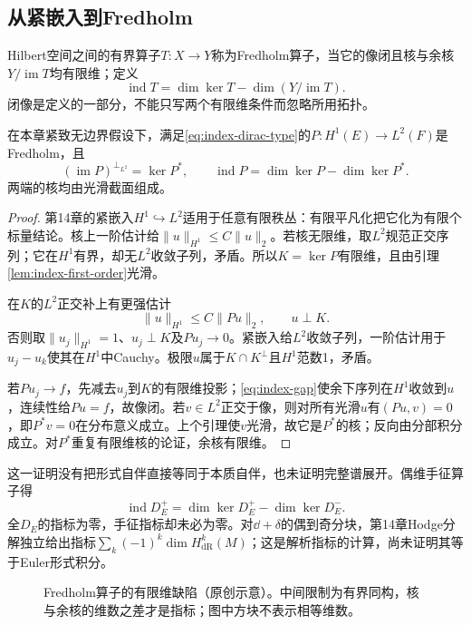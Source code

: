 \subsection{从紧嵌入到Fredholm}
Hilbert空间之间的有界算子$T:X\to Y$称为Fredholm算子，当它的像闭且核与余核$Y/\operatorname{im}T$均有限维；定义
\[
 \operatorname{ind}T=\dim\ker T-\dim(Y/\operatorname{im}T).
\]
闭像是定义的一部分，不能只写两个有限维条件而忽略所用拓扑。

\begin{theorem}\label{thm:index-fredholm}
在本章紧致无边界假设下，满足\eqref{eq:index-dirac-type}的$P:H^1(E)\to L^2(F)$是Fredholm，且
\[
 (\operatorname{im}P)^{\perp_{L^2}}=\ker P^*,\qquad
 \operatorname{ind}P=\dim\ker P-\dim\ker P^*.
\]
两端的核均由光滑截面组成。
\end{theorem}
\begin{proof}
第14章的紧嵌入$H^1\hookrightarrow L^2$适用于任意有限秩丛：有限平凡化把它化为有限个标量结论。核上一阶估计给$\|u\|_{H^1}\leq C\|u\|_2$。若核无限维，取$L^2$规范正交序列；它在$H^1$有界，却无$L^2$收敛子列，矛盾。所以$K=\ker P$有限维，且由引理\ref{lem:index-first-order}光滑。

在$K$的$L^2$正交补上有更强估计
\begin{equation}\label{eq:index-gap}
 \|u\|_{H^1}\leq C\|Pu\|_2,\qquad u\perp K.
\end{equation}
否则取$\|u_j\|_{H^1}=1$、$u_j\perp K$及$Pu_j\to0$。紧嵌入给$L^2$收敛子列，一阶估计用于$u_j-u_k$使其在$H^1$中Cauchy。极限$u$属于$K\cap K^\perp$且$H^1$范数1，矛盾。

若$Pu_j\to f$，先减去$u_j$到$K$的有限维投影；\eqref{eq:index-gap}使余下序列在$H^1$收敛到$u$，连续性给$Pu=f$，故像闭。若$v\in L^2$正交于像，则对所有光滑$u$有$(Pu,v)=0$，即$P^*v=0$在分布意义成立。上个引理使$v$光滑，故它是$P^*$的核；反向由分部积分成立。对$P^*$重复有限维核的论证，余核有限维。
\end{proof}

这一证明没有把形式自伴直接等同于本质自伴，也未证明完整谱展开。偶维手征算子得
\[
 \operatorname{ind}D_E^+=\dim\ker D_E^+-\dim\ker D_E^-.
\]
全$D_E$的指标为零，手征指标却未必为零。对$\dd+\delta$的偶到奇分块，第14章Hodge分解独立给出指标$\sum_k(-1)^k\dim H^k_{\mathrm{dR}}(M)$；这是解析指标的计算，尚未证明其等于Euler形式积分。

\begin{figure}[htbp]
 \centering
 \caption{Fredholm算子的有限维缺陷（原创示意）。中间限制为有界同构，核与余核的维数之差才是指标；图中方块不表示相等维数。}
\end{figure}

